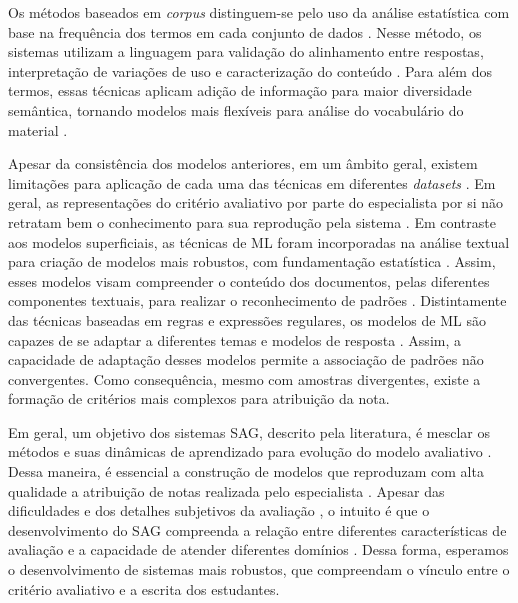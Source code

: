 Os métodos baseados em \textit{corpus} distinguem-se pelo uso da análise estatística com base na frequência dos termos em cada conjunto de dados \cite{kumar2019}. Nesse método, os sistemas utilizam a linguagem para validação do alinhamento entre respostas, interpretação de variações de uso e caracterização do conteúdo \cite{ziai2012, menini2019}. Para além dos termos, essas técnicas aplicam adição de informação para maior diversidade semântica, tornando modelos mais flexíveis para análise do vocabulário do material \cite{fowler2021}.

Apesar da consistência dos modelos anteriores, em um âmbito geral, existem limitações para aplicação de cada uma das técnicas em diferentes \textit{datasets} \cite{riordan2019, ding2020}. Em geral, as representações do critério avaliativo por parte do especialista por si não retratam bem o conhecimento para sua reprodução pela sistema \cite{filighera2020}. Em contraste aos modelos superficiais, as técnicas de ML foram incorporadas na análise textual para criação de modelos mais robustos, com fundamentação estatística \cite{galhardi2018b}. Assim, esses modelos visam compreender o conteúdo dos documentos, pelas diferentes componentes textuais, para realizar o reconhecimento de padrões \cite{suzen2020}. Distintamente das técnicas baseadas em regras e expressões regulares, os modelos de ML são capazes de se adaptar a diferentes temas e modelos de resposta \cite{zhang2016, saha2019, camus2020}. Assim, a capacidade de adaptação desses modelos permite a associação de padrões não convergentes. Como consequência, mesmo com amostras divergentes, existe a formação de critérios mais complexos para atribuição da nota.

Em geral, um objetivo dos sistemas SAG, descrito pela literatura, é mesclar os métodos e suas dinâmicas de aprendizado para evolução do modelo avaliativo \cite{burrows2015, zesch2018}. Dessa maneira, é essencial a construção de modelos que reproduzam com alta qualidade a atribuição de notas realizada pelo especialista \cite{jordan2012}. Apesar das dificuldades e dos detalhes subjetivos da avaliação \cite{roy2018}, o intuito é que o desenvolvimento do SAG compreenda a relação entre diferentes características de avaliação e a capacidade de atender diferentes domínios \cite{sung2019a, saha2019}. Dessa forma, esperamos o desenvolvimento de sistemas mais robustos, que compreendam o vínculo entre o critério avaliativo e a escrita dos estudantes.

